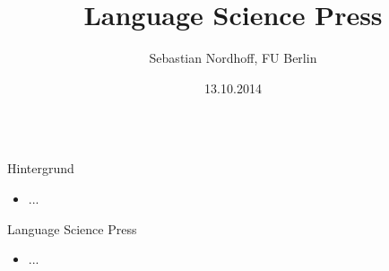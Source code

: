 \documentclass[final]{beamer}
\title{\Huge Language Science Press}
\author{Sebastian Nordhoff, FU Berlin}
\institute[Titel]{Titel} %
\date{13.10.2014}
\begin{document}
\begin{frame}{} 
\vspace{-1cm}
\begin{columns}[t]
  \begin{column}{.45\linewidth}  
    \begin{block}{Hintergrund} 
	\begin{itemize}
	\item ...
	\end{itemize} 
    \end{block}    

    \begin{block}{Language Science Press} 
	\begin{itemize} 
	\item ...
	\end{itemize}  
    \end{block}
   
  \end{column}

  \begin{column}{.45\linewidth}
    

\end{column}
\end{columns}
\end{frame}
\end{document}
